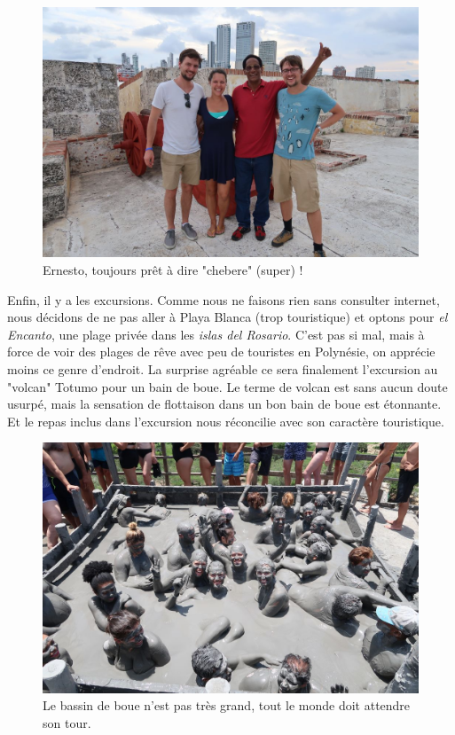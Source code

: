 \begin{figure}
\centering
\includegraphics{images/20180917_ernesto.JPG}
\caption{Ernesto, toujours prêt à dire "chebere" (super) !}
\end{figure}

Enfin, il y a les excursions. Comme nous ne faisons rien sans consulter
internet, nous décidons de ne pas aller à Playa Blanca (trop
touristique) et optons pour \emph{el Encanto}, une plage privée dans les
\emph{islas del Rosario}. C'est pas si mal, mais à force de voir des
plages de rêve avec peu de touristes en Polynésie, on apprécie moins ce
genre d'endroit. La surprise agréable ce sera finalement l'excursion au
"volcan" Totumo pour un bain de boue. Le terme de volcan est sans aucun
doute usurpé, mais la sensation de flottaison dans un bon bain de boue
est étonnante. Et le repas inclus dans l'excursion nous réconcilie avec
son caractère touristique.

\begin{figure}
\centering
\includegraphics{images/20180917_totumo.JPG}
\caption{Le bassin de boue n'est pas très grand, tout le monde doit
attendre son tour.}
\end{figure}

